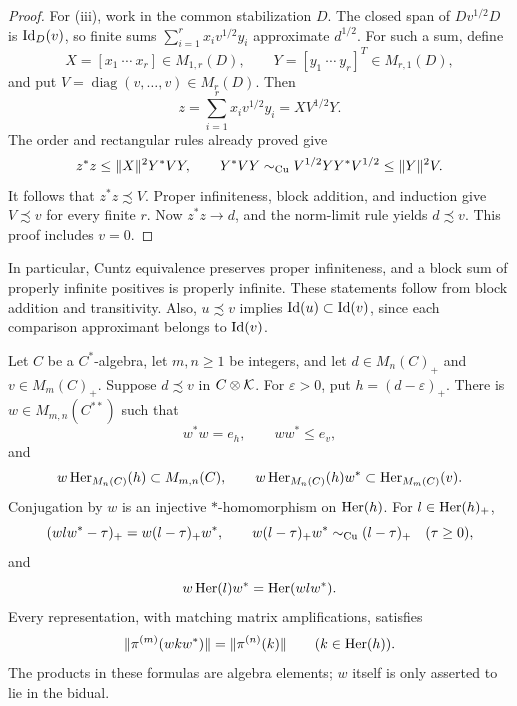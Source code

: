 \begin{proof}
For (iii), work in the common stabilization \(D\).  The closed span
of \(Dv^{1/2}D\) is \(\operatorname{Id}_D(v)\), so finite sums
\(\sum_{i=1}^r x_i v^{1/2}y_i\) approximate \(d^{1/2}\).
For such a sum, define
\[
 X=[x_1\ \cdots\ x_r]\in M_{1,r}(D),\qquad
 Y=[y_1\ \cdots\ y_r]^T\in M_{r,1}(D),
\]
and put \(V=\operatorname{diag}(v,\ldots,v)\in M_r(D)\).  Then
\[
 z=\sum_{i=1}^r x_i v^{1/2}y_i=X V^{1/2}Y.
\]
The order and rectangular rules already proved give
\[
 z^*z\le\|X\|^2Y^*VY,\qquad
 Y^*VY\sim_{\mathrm{Cu}} V^{1/2}YY^*V^{1/2}\le\|Y\|^2V.
\]
It follows that \(z^*z\precsim V\).  Proper infiniteness, block
addition, and induction give \(V\precsim v\) for every finite \(r\).
Now \(z^*z\to d\), and the norm-limit rule yields \(d\precsim v\).
This proof includes \(v=0\).
\end{proof}

In particular, Cuntz equivalence preserves proper infiniteness, and
a block sum of properly infinite positives is properly infinite.
These statements follow from block addition and transitivity.
Also, \(u\precsim v\) implies \(\operatorname{Id}(u)\subset\operatorname{Id}(v)\), since
each comparison approximant belongs to \(\operatorname{Id}(v)\).

\begin{lemma}\label{lem:transport}
Let \(C\) be a \(C^*\)-algebra, let \(m,n\ge1\) be integers,
and let \(d\in M_n(C)_+\) and \(v\in M_m(C)_+\).
Suppose \(d\precsim v\) in \(C\otimes\mathcal K\).  For
\(\varepsilon>0\), put
\(h=(d-\varepsilon)_+\).  There is \(w\in M_{m,n}(C^{**})\)
such that
\begin{equation}\label{eq:transport-supports}
 w^*w=e_h,\qquad ww^*\le e_v,
\end{equation}
and
\begin{equation}\label{eq:transport-membership}
 w\operatorname{Her}_{M_n(C)}(h)\subset M_{m,n}(C),\qquad
 w\operatorname{Her}_{M_n(C)}(h)w^*\subset\operatorname{Her}_{M_m(C)}(v).
\end{equation}
Conjugation by \(w\) is an injective \(*\)-homomorphism on
\(\operatorname{Her}(h)\).  For \(l\in\operatorname{Her}(h)_+\),
\begin{equation}\label{eq:transport-cutoffs}
 (wlw^*-\tau)_+=w(l-\tau)_+w^*,\qquad
 w(l-\tau)_+w^*\sim_{\mathrm{Cu}}(l-\tau)_+\quad(\tau\ge0),
\end{equation}
and
\begin{equation}\label{eq:transport-hereditary-image}
 w\operatorname{Her}(l)w^*=\operatorname{Her}(wlw^*).
\end{equation}
Every representation, with matching matrix amplifications, satisfies
\begin{equation}\label{eq:transport-represented-norm}
 \|\pi^{(m)}(wkw^*)\|=\|\pi^{(n)}(k)\|
 \qquad(k\in\operatorname{Her}(h)).
\end{equation}
The products in these formulas are algebra elements; \(w\) itself
is only asserted to lie in the bidual.
\end{lemma}

